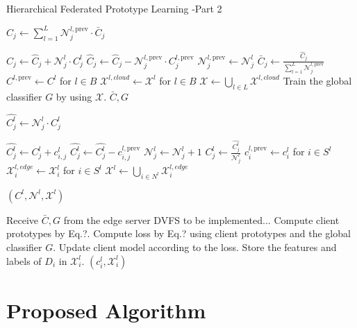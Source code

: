 \documentclass{article}
\begin{document}
\begin{algorithm}[H]
  \caption{Hierarchical Federated Prototype Learning -Part 2}
  \begin{algorithmic}[1]
    \State \( \hat{C}_{j} \gets \sum_{l=1}^{L} {\mathcal{N}_j^{l,\text{prev}}} \cdot\bar{C}_{j} \) 

    \State \( \hat{C}_{j}  \gets \hat{C}_{j} + {\mathcal{N}_j^l} \cdot C^l_j \)
    \State \( \hat{C}_{j}  \gets \hat{C}_{j} - {\mathcal{N}_j^{l,\text{prev}}} \cdot C_j^{l, \text{prev}} \)
    \EndIf
    \State \( {\mathcal{N}_j^{l,\text{prev}}} \gets \mathcal{N}_j^l \)
    \EndFor
    \State \( \bar{C}_{j} \gets \frac{\hat{C}_{j}}{\sum_{l=1}^{L} {\mathcal{N}_j^{l,\text{prev}}}} \)
    \EndFor
    \State \( C^{l,\text{prev}} \gets C^l \) for \( l \in B \)
    \State \( \mathcal{X}^{l,cloud} \gets \mathcal{X}^l \) for \(l \in B \)
    \State \( \mathcal{X} \gets \bigcup_{l \in L} \mathcal{X}^{l,cloud} \)
    \State Train the global classifier \( G \) by using \( \mathcal{X} \).
    \State \Return \( \bar{C}, G \)
    \EndProcedure

    \State \( {\hat{C^l_j}} \gets \mathcal{N}^l_j \cdot C^l_{j} \)

    \State \( {\hat{C^l_j}}  \gets {\hat{C^l_j}} + c^l_{i,j} \)
    \State \( {\hat{C^l_j}}  \gets {\hat{C^l_j}} - c^{l,\text{prev}}_{i,j}\)
    \Else
    \State \( \mathcal{N}_j^l \gets \mathcal{N}_j^l + 1 \)
    \EndIf
    \EndFor
    \State \( {C^l_j} \gets \frac{{\hat{C^l_j}}}{\mathcal{N}_j^l} \)
    \EndFor
    \State \( c^{l,\text{prev}}_i \gets c^l_i \) for \( i \in S^l \)
    \State \( \mathcal{X}^{l,edge}_i \gets  \mathcal{X}^l_i \) for \( i \in S^l \)
    \State \( \mathcal{X}^l \gets \bigcup_{i \in N^l} \mathcal{X}^{l,edge}_i \)

    \State \Return \( (C^l, \mathcal{N}^l, \mathcal{X}^l) \)
    \EndProcedure

    \State Receive \( \bar{C}, G \) from the edge server
    \State DVFS to be implemented...
    \State Compute client prototypes by Eq.?.
    \State Compute loss by Eq.? using client prototypes and the global classifier $G$.
    \State Update client model according to the loss.
    \EndFor
    \State Store the features and labels of \(D_i\) in \( \mathcal{X}^l_i \).
    \EndFor
    \State \Return \( (c^l_i, \mathcal{X}^l_i) \)
    \EndProcedure
  \end{algorithmic}
\end{algorithm}

\section{Proposed Algorithm}
\end{document}
